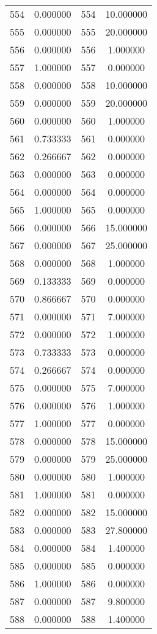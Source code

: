 \documentclass[12pt]{article}
\begin{document}
\begin{longtable}{@{}cccc@{}}
554 & 0.000000 & 554 & 10.000000 \\
555 & 0.000000 & 555 & 20.000000 \\
556 & 0.000000 & 556 & 1.000000 \\
557 & 1.000000 & 557 & 0.000000 \\
558 & 0.000000 & 558 & 10.000000 \\
559 & 0.000000 & 559 & 20.000000 \\
560 & 0.000000 & 560 & 1.000000 \\
561 & 0.733333 & 561 & 0.000000 \\
562 & 0.266667 & 562 & 0.000000 \\
563 & 0.000000 & 563 & 0.000000 \\
564 & 0.000000 & 564 & 0.000000 \\
565 & 1.000000 & 565 & 0.000000 \\
566 & 0.000000 & 566 & 15.000000 \\
567 & 0.000000 & 567 & 25.000000 \\
568 & 0.000000 & 568 & 1.000000 \\
569 & 0.133333 & 569 & 0.000000 \\
570 & 0.866667 & 570 & 0.000000 \\
571 & 0.000000 & 571 & 7.000000 \\
572 & 0.000000 & 572 & 1.000000 \\
573 & 0.733333 & 573 & 0.000000 \\
574 & 0.266667 & 574 & 0.000000 \\
575 & 0.000000 & 575 & 7.000000 \\
576 & 0.000000 & 576 & 1.000000 \\
577 & 1.000000 & 577 & 0.000000 \\
578 & 0.000000 & 578 & 15.000000 \\
579 & 0.000000 & 579 & 25.000000 \\
580 & 0.000000 & 580 & 1.000000 \\
581 & 1.000000 & 581 & 0.000000 \\
582 & 0.000000 & 582 & 15.000000 \\
583 & 0.000000 & 583 & 27.800000 \\
584 & 0.000000 & 584 & 1.400000 \\
585 & 0.000000 & 585 & 0.000000 \\
586 & 1.000000 & 586 & 0.000000 \\
587 & 0.000000 & 587 & 9.800000 \\
588 & 0.000000 & 588 & 1.400000 \\

\end{longtable}
\end{document}
